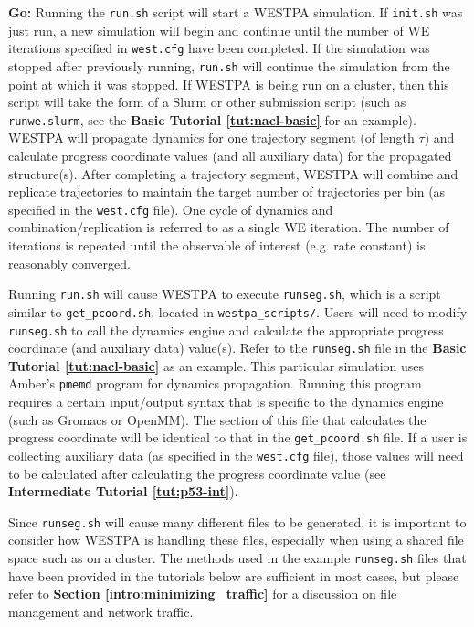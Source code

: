 \textbf{Go:} Running the \verb|run.sh| script will start a WESTPA simulation. 
If \verb|init.sh| was just run, a new simulation will begin and continue until the number of WE iterations specified in \verb|west.cfg| have been completed. 
If the simulation was stopped after previously running, \verb|run.sh| will continue the simulation from the point at which it was stopped. 
If WESTPA is being run on a cluster, then this script will take the form of a Slurm or other submission script (such as \verb|runwe.slurm|, see the \textbf{Basic Tutorial \ref{tut:nacl-basic}} for an example). 
WESTPA will propagate dynamics for one trajectory segment (of length $\tau$) and calculate progress coordinate values (and all auxiliary data) for the propagated structure(s). 
After completing a trajectory segment, WESTPA will combine and replicate trajectories to maintain the target number of trajectories per bin (as specified in the \verb|west.cfg| file). 
One cycle of dynamics and combination/replication is referred to as a single WE iteration. 
The number of iterations is repeated until the observable of interest (e.g. rate constant) is reasonably converged.

Running \verb|run.sh| will cause WESTPA to execute \verb|runseg.sh|, which is a script similar to \verb|get_pcoord.sh|, located in \verb|westpa_scripts/|. 
Users will need to modify \verb|runseg.sh| to call the dynamics engine and calculate the appropriate progress coordinate (and auxiliary data) value(s). 
Refer to the \verb|runseg.sh| file in the \textbf{Basic Tutorial \ref{tut:nacl-basic}} as an example. 
This particular simulation uses Amber’s \verb|pmemd| program for dynamics propagation. 
Running this program requires a certain input/output syntax that is specific to the dynamics engine (such as Gromacs or OpenMM). 
The section of this file that calculates the progress coordinate will be identical to that in the \verb|get_pcoord.sh| file. If a user is collecting auxiliary data (as specified in the \verb|west.cfg| file), those values will need to be calculated after calculating the progress coordinate value (see \textbf{Intermediate Tutorial \ref{tut:p53-int}}).

Since \verb|runseg.sh| will cause many different files to be generated, it is important to consider how WESTPA is handling these files, especially when using a shared file space such as on a cluster. 
The methods used in the example \verb|runseg.sh| files that have been provided in the tutorials below are sufficient in most cases, but please refer to \textbf{Section \ref{intro:minimizing_traffic}} for a discussion on file management and network traffic.

